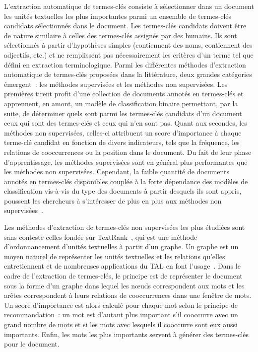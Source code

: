   L'extraction automatique de termes-clés consiste à sélectionner dans un
  document les unités textuelles les plus importantes parmi un ensemble de
  termes-clés candidats sélectionnés dans le document. Les termes-clés candidats
  doivent être de nature similaire à celles des termes-clés assignés par des
  humains. Ils sont sélectionnés à partir d'hypothèses simples (contiennent des
  noms, contiennent des adjectifs, etc.) et ne remplissent pas nécessairement
  les critères d'un terme tel que défini en extraction terminologique. Parmi les
  différentes méthodes d'extraction automatique de termes-clés proposées dans la
  littérature, deux grandes catégories émergent~: les méthodes supervisées et
  les méthodes non supervisées. Les premières tirent profit d'une collection de
  documents annotés en termes-clés et apprennent, en amont, un modèle de
  classification binaire permettant, par la suite, de déterminer quels sont
  parmi les termes-clés candidats d'un document ceux qui sont des termes-clés et
  ceux qui n'en sont pas. Quant aux secondes, les méthodes non supervisées,
  celles-ci attribuent un score d'importance à chaque terme-clé candidat en
  fonction de divers indicateurs, tels que la fréquence, les relations de
  cooccurrences ou la position dans le document. Du fait de leur phase
  d'apprentissage, les méthodes supervisées sont en général plus performantes
  que les méthodes non supervisées. Cependant, la faible quantité de documents
  annotés en termes-clés disponibles couplée à la forte dépendance des modèles
  de classification vis-à-vis du type des documents à partir desquels ils sont
  appris, poussent les chercheurs à s'intéresser de plus en plus aux méthodes
  non supervisées~\cite{hassan2010conundrums}.

  Les méthodes d'extraction de termes-clés non supervisées les plus étudiées
  sont sans conteste celles fondée sur TextRank~\cite{mihalcea2004textrank}, qui
  est une méthode d'ordonnancement d'unités textuelles à partir d'un graphe. Un
  graphe est un moyen naturel de représenter les unités textuelles et les
  relations qu'elles entretiennent et de nombreuses applications du TAL en font
  l'usage~\cite{kozareva2013textgraphs}. Dans le cadre de l'extraction de
  termes-clés, le principe est de représenter le document sous la forme d'un
  graphe dans lequel les n\oe{}uds correspondent aux mots et les arêtes
  correspondent à leurs relations de cooccurrences dans une fenêtre de mots. Un
  score d'importance est alors calculé pour chaque mot selon le principe de
  recommandation~: un mot est d'autant plus important s'il cooccurre avec un
  grand nombre de mots et si les mots avec lesquels il cooccurre sont eux aussi
  importants. Enfin, les mots les plus importants servent à générer des
  termes-clés pour le document.

